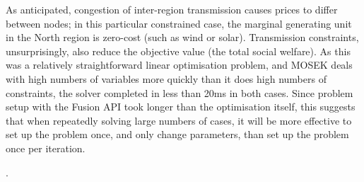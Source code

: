\documentclass[11pt,a4paper]{article}
\numberwithin{equation}{section}
\begin{document}
As anticipated, congestion of inter-region transmission causes prices to differ between nodes; in this particular constrained case, the marginal generating unit in the North region is zero-cost (such as wind or solar).
Transmission constraints, unsurprisingly, also reduce the objective value (the total social welfare).
As this was a relatively straightforward linear optimisation problem, and MOSEK deals with high numbers of variables more quickly than it does high numbers of constraints, the solver completed in less than 20ms in both cases.
Since problem setup with the Fusion API took longer than the optimisation itself, this suggests that when repeatedly solving large numbers of cases, it will be more effective to set up the problem once, and only change parameters, than set up the problem once per iteration.

\FloatBarrier



\renewcommand{\refname}{\section{References}}.

\end{document}
